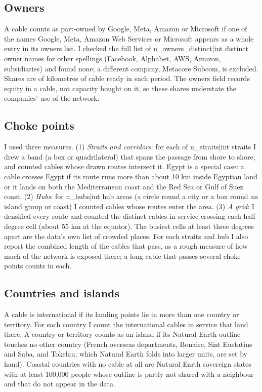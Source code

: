 \documentclass[11pt,a4paper]{article}
\begin{document}
\subsection{Owners}
A cable counts as part-owned by Google, Meta, Amazon or Microsoft if one of the names Google, Meta, Amazon Web Services or Microsoft appears as a whole entry in its owners list. I checked the full list of {{n_owners_distinct|int}} distinct owner names for other spellings (Facebook, Alphabet, AWS, Amazon, subsidiaries) and found none; a different company, Metacore Subcom, is excluded. Shares are of kilometres of cable ready in each period. The owners field records equity in a cable, not capacity bought on it, so these shares understate the companies' use of the network.

\subsection{Choke points}
I used three measures. (1) \emph{Straits and corridors}: for each of {{n_straits|int}} straits I drew a band (a box or quadrilateral) that spans the passage from shore to shore, and counted cables whose drawn routes intersect it. Egypt is a special case: a cable crosses Egypt if its route runs more than about 10 km inside Egyptian land or it lands on both the Mediterranean coast and the Red Sea or Gulf of Suez coast. (2) \emph{Hubs}: for {{n_hubs|int}} hub areas (a circle round a city or a box round an island group or coast) I counted cables whose routes enter the area. (3) \emph{A grid}: I densified every route and counted the distinct cables in service crossing each half-degree cell (about 55 km at the equator). The busiest cells at least three degrees apart are the data's own list of crowded places. For each straits and hub I also report the combined length of the cables that pass, as a rough measure of how much of the network is exposed there; a long cable that passes several choke points counts in each.

\subsection{Countries and islands}
A cable is international if its landing points lie in more than one country or territory. For each country I count the international cables in service that land there. A country or territory counts as an island if its Natural Earth outline touches no other country (French overseas departments, Bonaire, Sint Eustatius and Saba, and Tokelau, which Natural Earth folds into larger units, are set by hand). Coastal countries with no cable at all are Natural Earth sovereign states with at least 100,000 people whose outline is partly not shared with a neighbour and that do not appear in the data.
\end{document}
